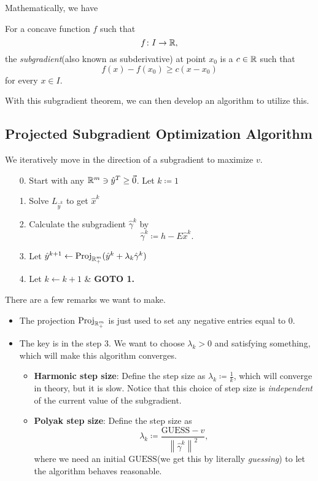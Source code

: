 Mathematically, we have
\begin{definition}
	\label{def:subgradient}
	For a concave function \(f\) such that
	\[
		f\colon I\to \mathbb{\MakeUppercase{R}},
	\]
	the \emph{subgradient}(also known as subderivative) at point \(x_0\) is a \(c\in \mathbb{\MakeUppercase{R}}\) such that
	\[
		f(x) - f(x_{0})\geq c(x - x_0)
	\]
	for every \(x\in I\).

\end{definition}

With this subgradient theorem, we can then develop an algorithm to utilize this.

\subsection{Projected Subgradient Optimization Algorithm}
\begin{intuition}
	We iteratively move in the direction of a subgradient to maximize \(v\).
\end{intuition}
\begin{enumerate}
	\item[0.] Start with any \(\mathbb{\MakeUppercase{R}}^m\ni \hat{y}^{T}\geq \vec{0}\). Let \(k\coloneqq 1\)
	\item[1.] Solve \(L_{\hat{y}^k}\) to get \(\hat{x}^k\)
	\item[2.] Calculate the subgradient \(\hat{\gamma}^k\) by
		\[
			\hat{\gamma}^k\coloneqq h - E \hat{x}^k.
		\]
	\item[3.] Let \(\hat{y}^{k+1}\leftarrow \mathrm{Proj}_{\mathbb{\MakeUppercase{R}}^m_+}(\hat{y}^k + \lambda_{k}\hat{\gamma}^k) \)
	\item[4.] Let \(k\leftarrow k+1\) \& \textbf{GOTO 1.}
\end{enumerate}
\begin{remark}
	There are a few remarks we want to make.
	\begin{itemize}
		\item The projection \(\mathrm{Proj}_{\mathbb{\MakeUppercase{R}}^m_+}\) is just used to set any negative entries equal to \(0\).
		\item The key is in the step 3. We want to choose \(\lambda_{k}>0\) and satisfying something, which will make this algorithm converges.
		      \begin{itemize}
			      \item \textbf{Harmonic step size}: Define the step size as \(\lambda_{k}\coloneqq \frac{1}{k}\), which will converge in theory, but it is slow. Notice that this choice of step size is \emph{independent} of the current value of the subgradient.
			      \item \textbf{Polyak step size}: Define the step size as
			            \[
				            \lambda_{k}\coloneqq \frac{\mathrm{GUESS} - v}{\left\lVert \hat{\gamma}^k\right\rVert^2 },
			            \]
			            where we need an initial \(\mathrm{GUESS}\)(we get this by literally \emph{guessing}) to let the algorithm behaves reasonable.
		      \end{itemize}
	\end{itemize}
\end{remark}